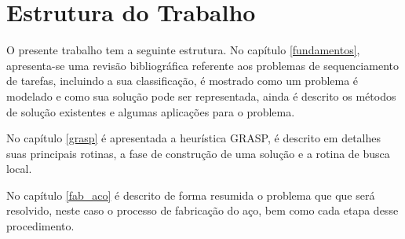 \section{Estrutura do Trabalho}

O presente trabalho tem a seguinte estrutura. No capítulo \ref{fundamentos}, apresenta-se uma revisão bibliográfica referente aos problemas de sequenciamento de tarefas, incluindo a sua classificação, é mostrado como um problema é modelado e como sua solução pode ser representada, ainda é descrito os métodos de solução existentes e algumas aplicações para o problema. 

No capítulo \ref{grasp} é apresentada a heurística GRASP, é descrito em detalhes suas principais rotinas, a fase de construção de uma solução e a rotina de busca local. 

No capítulo \ref{fab_aco} é descrito de forma resumida o problema que que será resolvido, neste caso o  processo de fabricação do aço, bem como cada etapa desse procedimento.



